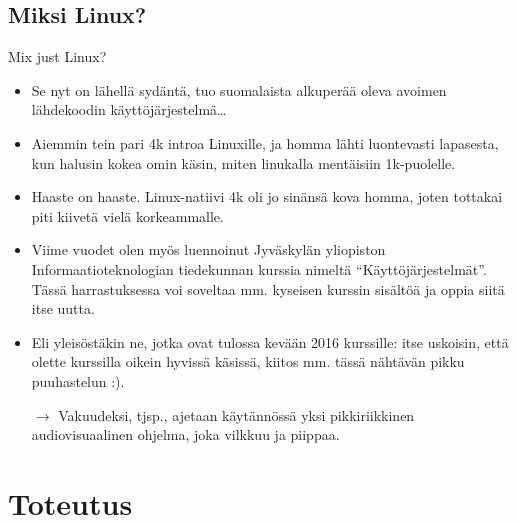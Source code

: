 \documentclass[pdf,10pt]{beamer}
\begin{document}
\subsection{Miksi Linux?}
\begin{frame}{Mix just Linux?}
  \begin{itemize}
    \item Se nyt on lähellä sydäntä, tuo suomalaista alkuperää oleva
      avoimen lähdekoodin käyttöjärjestelmä\ldots
    \item Aiemmin tein pari 4k introa Linuxille, ja homma lähti
      luontevasti lapasesta, kun halusin kokea omin käsin, miten
      linukalla mentäisiin 1k-puolelle.
    \item Haaste on haaste. Linux-natiivi 4k oli jo sinänsä kova
      homma, joten tottakai piti kiivetä vielä korkeammalle.
    \item Viime vuodet olen myös luennoinut Jyväskylän yliopiston
      Informaatioteknologian tiedekunnan kurssia nimeltä
      ``Käyttöjärjestelmät''. Tässä harrastuksessa voi soveltaa mm.
      kyseisen kurssin sisältöä ja oppia siitä itse uutta.
    \item Eli yleisöstäkin ne, jotka ovat tulossa kevään 2016
      kurssille: itse uskoisin, että olette kurssilla oikein hyvissä
      käsissä, kiitos mm. tässä nähtävän pikku puuhastelun :).
    \item[$\rightarrow$] Vakuudeksi, tjsp., ajetaan käytännössä yksi
      pikkiriikkinen audiovisuaalinen ohjelma, joka vilkkuu ja
      piippaa.
  \end{itemize}
\end{frame}

\section{Toteutus}
\end{document}
